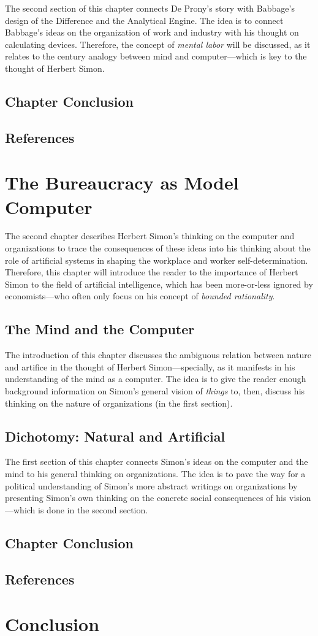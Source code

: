 \documentclass[version=last,draft=false,paper=A4,portrait,twoside=true,twocolumn=true,headinclude=false,footinclude=false,fontsize=12,BCOR=20mm,DIV=13,pagesize=auto,titlepage=firstiscover,mpinclude=false,open=right,chapterprefix=true,numbers=autoendperiod,headsepline=false,parskip=false]{scrbook}
\begin{document}
The second section of this chapter connects De Prony's story with Babbage's
design of the Difference and the Analytical Engine. The idea is to connect
Babbage's ideas on the organization of work and industry with his thought
on calculating devices. Therefore, the concept of \emph{mental labor} will be
discussed, as it relates to the  century analogy between
mind and computer---which is key to the thought of Herbert Simon.   

\section{Chapter Conclusion}
\label{sec:org7a9c2b2}
\section*{References}
\printbibliography[heading=none,keyword=chapter-1]
\chapter{The Bureaucracy as Model Computer}
\label{sec:org01d435a}
The second chapter describes Herbert Simon's thinking on the computer and
organizations to trace the consequences of these ideas into his thinking
about the role of artificial systems in shaping the workplace and worker
self-determination. Therefore, this chapter will introduce the reader to
the importance of Herbert Simon to the field of artificial intelligence,
which has been more-or-less ignored by economists---who often only focus on
his concept of \emph{bounded rationality}.
\section{The Mind and the Computer}
\label{sec:org05c8ab0}
The introduction of this chapter discusses the ambiguous relation between
nature and artifice in the thought of Herbert Simon---specially, as it
manifests in his understanding of the mind as a computer. The idea is to
give the reader enough background information on Simon's general vision of
\emph{things} to, then, discuss his thinking on the nature of organizations (in
the first section).

\section{Dichotomy: Natural and Artificial}
\label{sec:org3de7faf}
The first section of this chapter connects Simon's ideas on the computer
and the mind to his general thinking on organizations. The idea is to pave
the way for a political understanding of Simon's more abstract writings on
organizations by presenting Simon's own thinking on the concrete social
consequences of his vision---which is done in the second section.

\section{Chapter Conclusion}
\label{sec:orgca0227c}
\section*{References}
\printbibliography[heading=none,keyword=chapter-2]
\chapter{Conclusion}
\label{sec:orgaa71b09}
\end{document}
